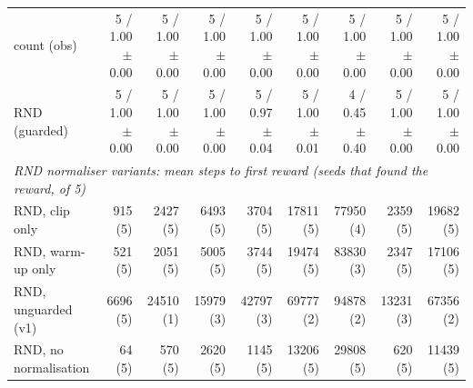 \begin{tabular}{lrrrrrrrr}
count (obs) & 5 / 1.00 $\pm$ 0.00 & 5 / 1.00 $\pm$ 0.00 & 5 / 1.00 $\pm$ 0.00 & 5 / 1.00 $\pm$ 0.00 & 5 / 1.00 $\pm$ 0.00 & 5 / 1.00 $\pm$ 0.00 & 5 / 1.00 $\pm$ 0.00 & 5 / 1.00 $\pm$ 0.00 \\
RND (guarded) & 5 / 1.00 $\pm$ 0.00 & 5 / 1.00 $\pm$ 0.00 & 5 / 1.00 $\pm$ 0.00 & 5 / 0.97 $\pm$ 0.04 & 5 / 1.00 $\pm$ 0.01 & 4 / 0.45 $\pm$ 0.40 & 5 / 1.00 $\pm$ 0.00 & 5 / 1.00 $\pm$ 0.00 \\
\hline
\multicolumn{9}{l}{\emph{RND normaliser variants: mean steps to first reward (seeds that found the reward, of 5)}} \\
RND, clip only & 915 (5) & 2427 (5) & 6493 (5) & 3704 (5) & 17811 (5) & 77950 (4) & 2359 (5) & 19682 (5) \\
RND, warm-up only & 521 (5) & 2051 (5) & 5005 (5) & 3744 (5) & 19474 (5) & 83830 (3) & 2347 (5) & 17106 (5) \\
RND, unguarded (v1) & 6696 (5) & 24510 (1) & 15979 (3) & 42797 (3) & 69777 (2) & 94878 (2) & 13231 (3) & 67356 (2) \\
RND, no normalisation & 64 (5) & 570 (5) & 2620 (5) & 1145 (5) & 13206 (5) & 29808 (5) & 620 (5) & 11439 (5) \\
\hline
\end{tabular}
